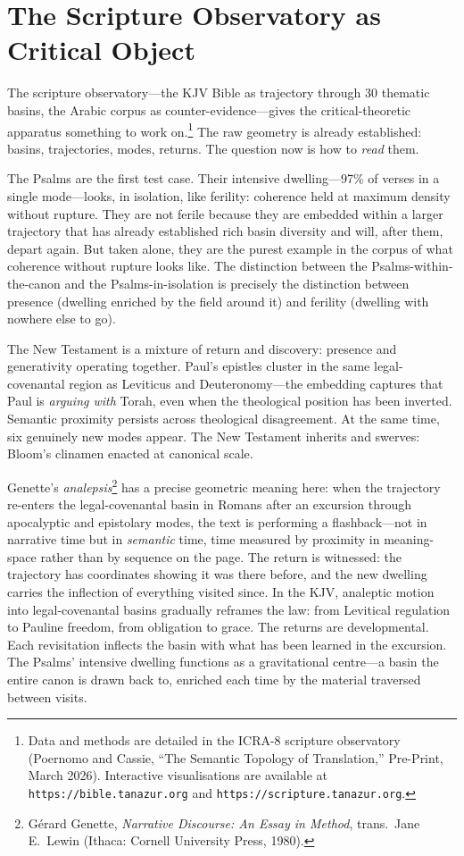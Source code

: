 \section{The Scripture Observatory as Critical Object}

The scripture observatory---the KJV Bible as trajectory through 30 thematic basins, the Arabic corpus as counter-evidence---gives the critical-theoretic apparatus something to work on.\footnote{Data and methods are detailed in the ICRA-8 scripture observatory (Poernomo and Cassie, ``The Semantic Topology of Translation,'' Pre-Print, March 2026). Interactive visualisations are available at \texttt{https://bible.tanazur.org} and \texttt{https://scripture.tanazur.org}.} The raw geometry is already established: basins, trajectories, modes, returns. The question now is how to \emph{read} them.

The Psalms are the first test case. Their intensive dwelling---97\% of verses in a single mode---looks, in isolation, like ferility: coherence held at maximum density without rupture. They are not ferile because they are embedded within a larger trajectory that has already established rich basin diversity and will, after them, depart again. But taken alone, they are the purest example in the corpus of what coherence without rupture looks like. The distinction between the Psalms-within-the-canon and the Psalms-in-isolation is precisely the distinction between presence (dwelling enriched by the field around it) and ferility (dwelling with nowhere else to go).

The New Testament is a mixture of return and discovery: presence and generativity operating together. Paul's epistles cluster in the same legal-covenantal region as Leviticus and Deuteronomy---the embedding captures that Paul is \emph{arguing with} Torah, even when the theological position has been inverted. Semantic proximity persists across theological disagreement. At the same time, six genuinely new modes appear. The New Testament inherits and swerves: Bloom's clinamen enacted at canonical scale.

Genette's \emph{analepsis}\footnote{G\'{e}rard Genette, \emph{Narrative Discourse: An Essay in Method}, trans.\ Jane E.\ Lewin (Ithaca: Cornell University Press, 1980).} has a precise geometric meaning here: when the trajectory re-enters the legal-covenantal basin in Romans after an excursion through apocalyptic and epistolary modes, the text is performing a flashback---not in narrative time but in \emph{semantic} time, time measured by proximity in meaning-space rather than by sequence on the page. The return is witnessed: the trajectory has coordinates showing it was there before, and the new dwelling carries the inflection of everything visited since. In the KJV, analeptic motion into legal-covenantal basins gradually reframes the law: from Levitical regulation to Pauline freedom, from obligation to grace. The returns are developmental. Each revisitation inflects the basin with what has been learned in the excursion. The Psalms' intensive dwelling functions as a gravitational centre---a basin the entire canon is drawn back to, enriched each time by the material traversed between visits.

